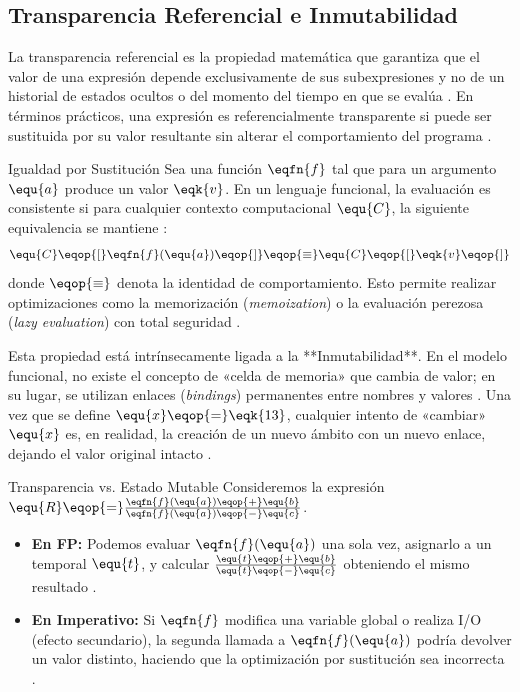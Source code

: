 \subsection{Transparencia Referencial e Inmutabilidad}
\label{subsec:4_1_2_transparencia}

La transparencia referencial es la propiedad matemática que garantiza que el valor de una expresión depende exclusivamente de sus subexpresiones y no de un historial de estados ocultos o del momento del tiempo en que se evalúa \cite{SICP, PFPL}. En términos prácticos, una expresión es referencialmente transparente si puede ser sustituida por su valor resultante sin alterar el comportamiento del programa \cite{PFPL}.

\begin{definicion}{Igualdad por Sustitución}
Sea una función $\eqfn{f}$ tal que para un argumento $\equ{a}$ produce un valor $\eqk{v}$. En un lenguaje funcional, la evaluación es consistente si para cualquier contexto computacional $\equ{C}$, la siguiente equivalencia se mantiene \cite{PFPL}:
\begin{equation}
    \equ{C}\eqop{[}\eqfn{f}(\equ{a})\eqop{]} \eqop{\equiv} \equ{C}\eqop{[}\eqk{v}\eqop{]}
\end{equation}
donde $\eqop{\equiv}$ denota la identidad de comportamiento. Esto permite realizar optimizaciones como la memorización (\textit{memoization}) o la evaluación perezosa (\textit{lazy evaluation}) con total seguridad \cite{SICP, PFPL}.
\end{definicion}

Esta propiedad está intrínsecamente ligada a la **Inmutabilidad**. En el modelo funcional, no existe el concepto de «celda de memoria» que cambia de valor; en su lugar, se utilizan enlaces (\textit{bindings}) permanentes entre nombres y valores \cite{SICP}. Una vez que se define $\equ{x} \eqop{=} \eqk{13}$, cualquier intento de «cambiar» $\equ{x}$ es, en realidad, la creación de un nuevo ámbito con un nuevo enlace, dejando el valor original intacto \cite{SICP, PFPL}.

\begin{ejemplo}{Transparencia vs. Estado Mutable}
Consideremos la expresión $\equ{R} \eqop{=} \frac{\eqfn{f}(\equ{a}) \eqop{+} \equ{b}}{\eqfn{f}(\equ{a}) \eqop{-} \equ{c}}$. 
\begin{itemize}
    \item \textbf{En FP:} Podemos evaluar $\eqfn{f}(\equ{a})$ una sola vez, asignarlo a un temporal $\equ{t}$, y calcular $\frac{\equ{t} \eqop{+} \equ{b}}{\equ{t} \eqop{-} \equ{c}}$ obteniendo el mismo resultado \cite{SICP}.
    \item \textbf{En Imperativo:} Si $\eqfn{f}$ modifica una variable global o realiza I/O (efecto secundario), la segunda llamada a $\eqfn{f}(\equ{a})$ podría devolver un valor distinto, haciendo que la optimización por sustitución sea incorrecta \cite{PFPL}.
\end{itemize}
\end{ejemplo}

